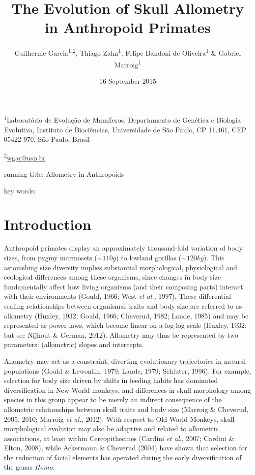 \documentclass[12pt,]{article}
\title{The Evolution of Skull Allometry in Anthropoid Primates}
\author{Guilherme Garcia\textsuperscript{1,2}, Thiago Zahn\textsuperscript{1},
Felipe Bandoni de Oliveira\textsuperscript{1} \& Gabriel
Marroig\textsuperscript{1}}
\date{16 September 2015}
\begin{document}
\maketitle


\linenumbers
\modulolinenumbers[2]

\onehalfspacing

\textsuperscript{1}Laboratório de Evolução de Mamíferos, Departamento de
Genética e Biologia Evolutiva, Instituto de Biociências, Universidade de
São Paulo, CP 11.461, CEP 05422-970, São Paulo, Brasil

\textsuperscript{2}\href{mailto:wgar@usp.br}{wgar@usp.br}

running title: Allometry in Anthropoids

key words:

\section{Introduction}\label{introduction}

Anthropoid primates display an approximately thousand-fold variation of
body sizes, from pygmy marmosets ($\sim 110g$) to lowland gorillas
($\sim 120kg$). This astonishing size diversity implies substantial
morphological, physiological and ecological differences among these
organisms, since changes in body size fundamentally affect how living
organisms (and their composing parts) interact with their environments
(Gould, 1966; West \emph{et al.}, 1997). These differential scaling
relationships between organismal traits and body size are referred to as
allometry (Huxley, 1932; Gould, 1966; Cheverud, 1982; Lande, 1985) and
may be represented as power laws, which become linear on a log-log scale
(Huxley, 1932; but see Nijhout \& German, 2012). Allometry may thus be
represented by two parameters: (allometric) slopes and intercepts.

Allometry may act as a constraint, diverting evolutionary trajectories
in natural populations (Gould \& Lewontin, 1979; Lande, 1979; Schluter,
1996). For example, selection for body size driven by shifts in feeding
habits has dominated diversification in New World monkeys, and
differences in skull morphology among species in this group appear to be
merely an indirect consequence of the allometric relationships between
skull traits and body size (Marroig \& Cheverud, 2005, 2010; Marroig
\emph{et al.}, 2012). With respect to Old World Monkeys, skull
morphological evolution may also be adaptive and related to allometric
associations, at least within Cercopithecines (Cardini \emph{et al.},
2007; Cardini \& Elton, 2008), while Ackermann \& Cheverud (2004) have
shown that selection for the reduction of facial elements has operated
during the early diversification of the genus \emph{Homo}.
\end{document}

